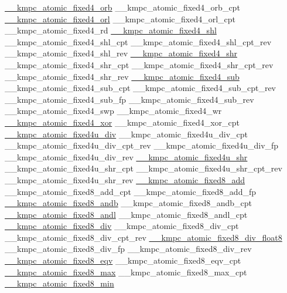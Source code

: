 \begin{DoxyCode}
\hyperlink{kmp__atomic_8h_a519579d278b4ad80ddcfe3d6a280f996}{\_\_kmpc\_atomic\_fixed4\_orb}
\_\_kmpc\_atomic\_fixed4\_orb\_cpt
\hyperlink{kmp__atomic_8h_a1db253710493d1721db2465a55c8421f}{\_\_kmpc\_atomic\_fixed4\_orl}
\_\_kmpc\_atomic\_fixed4\_orl\_cpt
\_\_kmpc\_atomic\_fixed4\_rd
\hyperlink{kmp__atomic_8h_ae77d94bfe3312a003fdfb1072e097f31}{\_\_kmpc\_atomic\_fixed4\_shl}
\_\_kmpc\_atomic\_fixed4\_shl\_cpt
\_\_kmpc\_atomic\_fixed4\_shl\_cpt\_rev
\_\_kmpc\_atomic\_fixed4\_shl\_rev
\hyperlink{kmp__atomic_8h_a6bd55b80cac511e482403f856c166c4e}{\_\_kmpc\_atomic\_fixed4\_shr}
\_\_kmpc\_atomic\_fixed4\_shr\_cpt
\_\_kmpc\_atomic\_fixed4\_shr\_cpt\_rev
\_\_kmpc\_atomic\_fixed4\_shr\_rev
\hyperlink{kmp__atomic_8h_a892f03ec5ebc2a98432d6a95573264ae}{\_\_kmpc\_atomic\_fixed4\_sub}
\_\_kmpc\_atomic\_fixed4\_sub\_cpt
\_\_kmpc\_atomic\_fixed4\_sub\_cpt\_rev
\_\_kmpc\_atomic\_fixed4\_sub\_fp
\_\_kmpc\_atomic\_fixed4\_sub\_rev
\_\_kmpc\_atomic\_fixed4\_swp
\_\_kmpc\_atomic\_fixed4\_wr
\hyperlink{kmp__atomic_8h_ac360976e328e1ffb921c8c4eb28afb29}{\_\_kmpc\_atomic\_fixed4\_xor}
\_\_kmpc\_atomic\_fixed4\_xor\_cpt
\hyperlink{kmp__atomic_8h_a286022c4f10fd528c19538febc7750a7}{\_\_kmpc\_atomic\_fixed4u\_div}
\_\_kmpc\_atomic\_fixed4u\_div\_cpt
\_\_kmpc\_atomic\_fixed4u\_div\_cpt\_rev
\_\_kmpc\_atomic\_fixed4u\_div\_fp
\_\_kmpc\_atomic\_fixed4u\_div\_rev
\hyperlink{kmp__atomic_8h_a420d2da3519e75855a1f8b0f1fe8a7c2}{\_\_kmpc\_atomic\_fixed4u\_shr}
\_\_kmpc\_atomic\_fixed4u\_shr\_cpt
\_\_kmpc\_atomic\_fixed4u\_shr\_cpt\_rev
\_\_kmpc\_atomic\_fixed4u\_shr\_rev
\hyperlink{kmp__atomic_8h_aafd282554e5b424314426ff86fa424f0}{\_\_kmpc\_atomic\_fixed8\_add}
\_\_kmpc\_atomic\_fixed8\_add\_cpt
\_\_kmpc\_atomic\_fixed8\_add\_fp
\hyperlink{kmp__atomic_8h_a130ecd6b1b9fc357a2b9a3528c33d4e7}{\_\_kmpc\_atomic\_fixed8\_andb}
\_\_kmpc\_atomic\_fixed8\_andb\_cpt
\hyperlink{kmp__atomic_8h_a4c157dcf6502a6dac67b84134b0dbb8f}{\_\_kmpc\_atomic\_fixed8\_andl}
\_\_kmpc\_atomic\_fixed8\_andl\_cpt
\hyperlink{kmp__atomic_8h_ab5315ca10b987c2749fd67c7cbbba4a8}{\_\_kmpc\_atomic\_fixed8\_div}
\_\_kmpc\_atomic\_fixed8\_div\_cpt
\_\_kmpc\_atomic\_fixed8\_div\_cpt\_rev
\hyperlink{kmp__atomic_8h_aff060723e3c3d7497c9ef40bae1f22c1}{\_\_kmpc\_atomic\_fixed8\_div\_float8}
\_\_kmpc\_atomic\_fixed8\_div\_fp
\_\_kmpc\_atomic\_fixed8\_div\_rev
\hyperlink{kmp__atomic_8h_a59130dbc730a9f722bcb329089a2ad01}{\_\_kmpc\_atomic\_fixed8\_eqv}
\_\_kmpc\_atomic\_fixed8\_eqv\_cpt
\hyperlink{kmp__atomic_8h_a84d84daec8f1d227b69876ce37174343}{\_\_kmpc\_atomic\_fixed8\_max}
\_\_kmpc\_atomic\_fixed8\_max\_cpt
\hyperlink{kmp__atomic_8h_a1943a1522545338a453bb57f8081ee99}{\_\_kmpc\_atomic\_fixed8\_min}

\end{DoxyCode}
